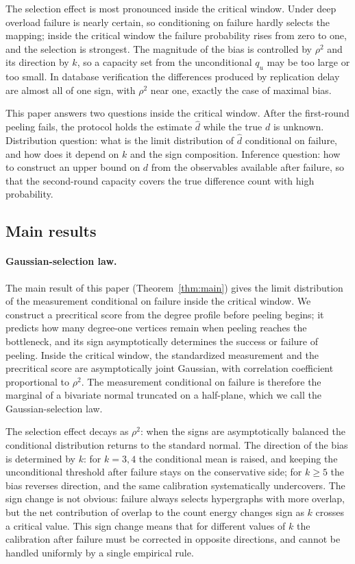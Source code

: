 The selection effect is most pronounced inside the critical window. Under deep overload failure is nearly certain, so conditioning on failure hardly selects the mapping; inside the critical window the failure probability rises from zero to one, and the selection is strongest. The magnitude of the bias is controlled by $\rho^2$ and its direction by $k$, so a capacity set from the unconditional $q_u$ may be too large or too small. In database verification the differences produced by replication delay are almost all of one sign, with $\rho^2$ near one, exactly the case of maximal bias.

This paper answers two questions inside the critical window. After the first-round peeling fails, the protocol holds the estimate $\widehat d$ while the true $d$ is unknown. Distribution question: what is the limit distribution of $\widehat d$ conditional on failure, and how does it depend on $k$ and the sign composition. Inference question: how to construct an upper bound on $d$ from the observables available after failure, so that the second-round capacity covers the true difference count with high probability.

\subsection{Main results}

\paragraph{Gaussian-selection law.}
The main result of this paper (Theorem~\ref{thm:main}) gives the limit distribution of the measurement conditional on failure inside the critical window.
We construct a precritical score from the degree profile before peeling begins; it predicts how many degree-one vertices remain when peeling
reaches the bottleneck, and its sign asymptotically determines the success or failure of peeling. Inside the critical window,
the standardized measurement and the precritical score are asymptotically joint Gaussian, with correlation coefficient proportional to $\rho^2$. The measurement conditional on failure is therefore the marginal
of a bivariate normal truncated on a half-plane, which we call the Gaussian-selection law.

The selection effect decays as $\rho^2$: when the signs are asymptotically balanced the conditional distribution returns to the standard normal. The direction of the bias is determined by $k$: for $k=3,4$
the conditional mean is raised, and keeping the unconditional threshold after failure stays on the conservative side; for $k\ge5$
the bias reverses direction, and the same calibration systematically undercovers. The sign change is not obvious: failure always selects hypergraphs with more overlap, but the net contribution of overlap to the count energy changes sign as $k$ crosses a critical value. This sign change means that for different values of $k$ the calibration after failure
must be corrected in opposite directions, and cannot be handled uniformly by a single empirical rule.

